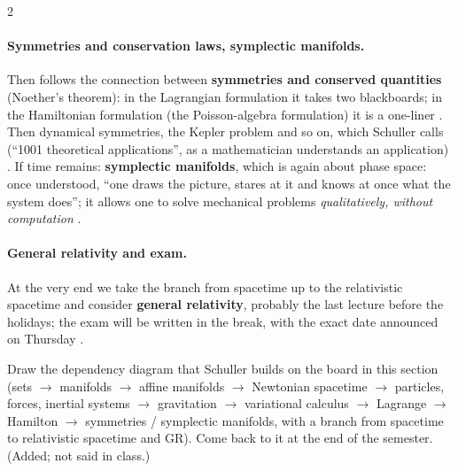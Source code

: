 \begin{paracol}{2}
\paragraph{Symmetries and conservation laws, symplectic manifolds.} Then follows the connection between \textbf{symmetries
and conserved quantities} (Noether's theorem): in the Lagrangian formulation it takes two blackboards; in the Hamiltonian
formulation (the Poisson-algebra formulation) it is a one-liner . Then dynamical
symmetries, the Kepler problem and so on, which Schuller calls (``1001 theoretical applications'', as a mathematician
understands an application) . If time remains: \textbf{symplectic manifolds}, which is
again about phase space: once understood, ``one draws the picture, stares at it and knows at once what the system does'';
it allows one to solve mechanical problems \emph{qualitatively, without computation} .

\paragraph{General relativity and exam.} At the very end we take the branch from spacetime up to the relativistic
spacetime and consider \textbf{general relativity}, probably the last lecture before the holidays; the exam will be
written in the break, with the exact date announced on Thursday .

\begin{exercise}\label{ex:bv-outline}
Draw the dependency diagram that Schuller builds on the board in this section (sets $\to$ manifolds $\to$ affine manifolds
$\to$ Newtonian spacetime $\to$ particles, forces, inertial systems $\to$ gravitation $\to$ variational calculus
$\to$ Lagrange $\to$ Hamilton $\to$ symmetries / symplectic manifolds, with a branch from spacetime to relativistic
spacetime and GR). Come back to it at the end of the semester. (Added; not said in class.)
\end{exercise}


\end{paracol}
